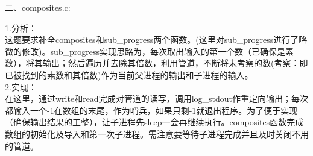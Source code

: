 \documentclass[12pt]{article}
\begin{document}
\newpage
\begin{large}
    \noindent 二、composites.c:\\
\end{large}
1.分析：\\
\hspace*{2em}这题要求补全composites和sub\_progress两个函数。(这里对sub\_progress进行了略微的修改)。sub\_progress实现思路为，每次取出输入的第一个数（已确保是素数），将其输出；然后遍历并去除其倍数，利用管道，不断将未考察的数(考察：即已被找到的素数和其倍数)作为当前父进程的输出和子进程的输入。\\
2.实现：\\
\hspace*{2em}在这里，通过write和read完成对管道的读写，调用log\_stdout作重定向输出；每次都输入一个-1在数组的末尾，作为哨兵，如果只剩-1就退出程序。为了便于实现（确保输出结果的工整），让子进程先sleep一会再继续执行。composites函数完成数组的初始化及导入和第一次子进程。需注意要等待子进程完成并且及时关闭不用的管道。
\begin{figure}[!h]
    \centering
    \hfill
\end{figure}\\
\end{document}
